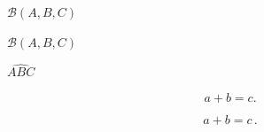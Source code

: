 \documentclass[]{article}
\begin{document}
$\mathcal{B}\left(A, B, C\right)$

$\mathcal{B}(A, B, C)$

$\widehat{ABC}$

\[ a + b = c. \]

\[
a + b = c \, .
\]
\end{document}
